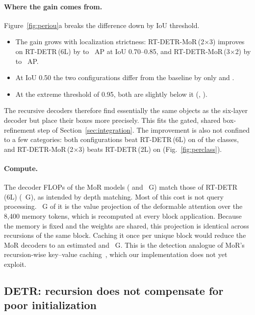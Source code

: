 \documentclass[pdflatex,iicol,sn-basic,Numbered]{sn-jnl}
\newcommand{\x}{\ensuremath{\times}}
\newcommand{\rtsix}{RT-DETR\,(6L)}
\newcommand{\rttwo}{RT-DETR\,(2L)}
\newcommand{\rtA}{RT-DETR-MoR\,(2\x3)}
\newcommand{\rtB}{RT-DETR-MoR\,(3\x2)}
\begin{document}
\paragraph{Where the gain comes from.}
Figure~\ref{fig:periou}a breaks the difference down by IoU threshold.
\begin{itemize}
\item The gain grows with localization strictness: \rtA{} improves on \rtsix{} by  to ~AP at IoU 0.70--0.85, and \rtB{} by  to ~AP.
\item At IoU 0.50 the two configurations differ from the baseline by only  and .
\item At the extreme threshold of 0.95, both are slightly below it (, ).
\end{itemize}
The recursive decoders therefore find essentially the same objects as the six-layer decoder but place their boxes more precisely. This fits the gated, shared box-refinement step of Section~\ref{sec:integration}. The improvement is also not confined to a few categories: both configurations beat \rtsix{} on  of the  classes, and \rtA{} beats \rttwo{} on  (Fig.~\ref{fig:perclass}).

\paragraph{Compute.}
The decoder FLOPs of the MoR models ( and ~G) match those of \rtsix{} (~G), as intended by depth matching. Most of this cost is not query processing. ~G of it is the value projection of the deformable attention over the 8{,}400 memory tokens, which is recomputed at every block application. Because the memory is fixed and the weights are shared, this projection is identical across recursions of the same block. Caching it once per unique block would reduce the MoR decoders to an estimated  and ~G. This is the detection analogue of MoR's recursion-wise key--value caching~\cite{bae2025mor}, which our implementation does not yet exploit.

\subsection{DETR: recursion does not compensate for poor initialization}\label{sec:res-detr}
\end{document}
